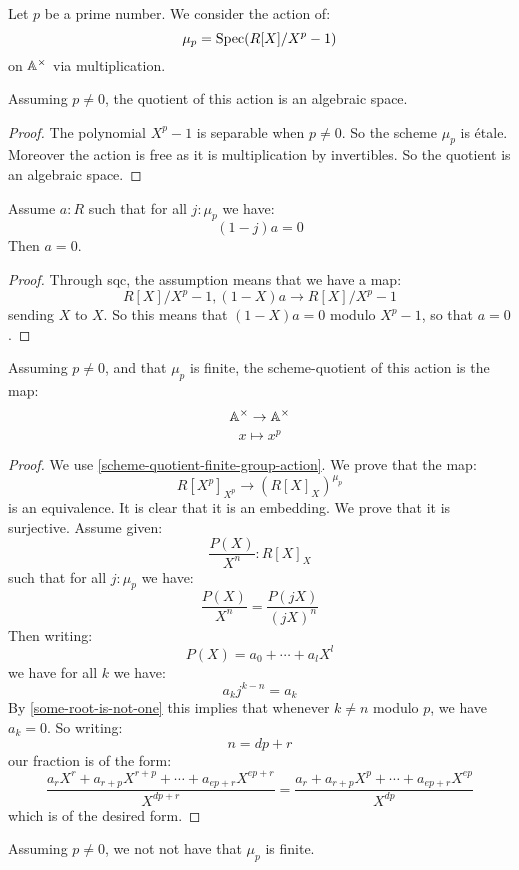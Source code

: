Let $p$ be a prime number. We consider the action of:
\[\mu_p = \operatorname{Spec}(R[X]/X^p-1)\]
on $\mathbb{A}^\times$ via multiplication.

\begin{lemma}\label{quotient-is-algebraic-space}
Assuming $p\not=0$, the quotient of this action is an algebraic space.
\end{lemma}

\begin{proof}
The polynomial $X^p-1$ is separable when $p\not=0$. So the scheme $\mu_p$ is étale. Moreover the action is free as it is multiplication by invertibles. So the quotient is an algebraic space.
\end{proof}

\begin{lemma}\label{some-root-is-not-one}
Assume $a:R$ such that for all $j:\mu_p$ we have:
\[(1-j)a = 0\]
Then $a=0$.
\end{lemma}

\begin{proof}
Through sqc, the assumption means that we have a map:
\[R[X]/X^p-1,(1-X)a \to R[X]/X^p-1\]
sending $X$ to $X$. So this means that $(1-X)a = 0$ modulo $X^p-1$, so that $a=0$.
\end{proof}

\begin{lemma}\label{scheme-quotient-Ax-mup}
Assuming $p\not=0$, and that $\mu_p$ is finite, the scheme-quotient of this action is the map:
\[\mathbb{A}^\times \to \mathbb{A}^\times\]
\[x\mapsto x^p\]
\end{lemma}

\begin{proof}
We use \cref{scheme-quotient-finite-group-action}. We prove that the map:
\[R[X^p]_{X^p} \to (R[X]_X)^{\mu_p} \]
is an equivalence. It is clear that it is an embedding. We prove that it is surjective. Assume given:
\[\frac{P(X)}{X^n} : R[X]_X\]
such that for all $j:\mu_p$ we have:
\[\frac{P(X)}{X^n} = \frac{P(jX)}{(jX)^n} \]
Then writing:
\[P(X) = a_0 + \cdots + a_l X^l\]
we have for all $k$ we have:
\[ a_k j^{k-n} = a_k\]
By \cref{some-root-is-not-one} this implies that whenever $k\not=n$ modulo $p$, we have $a_k=0$. So writing:
\[n = dp + r\]
 our fraction is of the form:
\[\frac{a_rX^r + a_{r+p} X^{r+p} +\cdots + a_{ep + r} X^{ep + r}}{X^{dp+r}} = \frac{a_r + a_{r+p} X^{p} +\cdots + a_{ep + r} X^{ep}}{X^{dp}}\]
which is of the desired form.
\end{proof}

\begin{lemma}\label{mup-not-not-finite}
Assuming $p\not=0$, we not not have that $\mu_p$ is finite.
\end{lemma}

